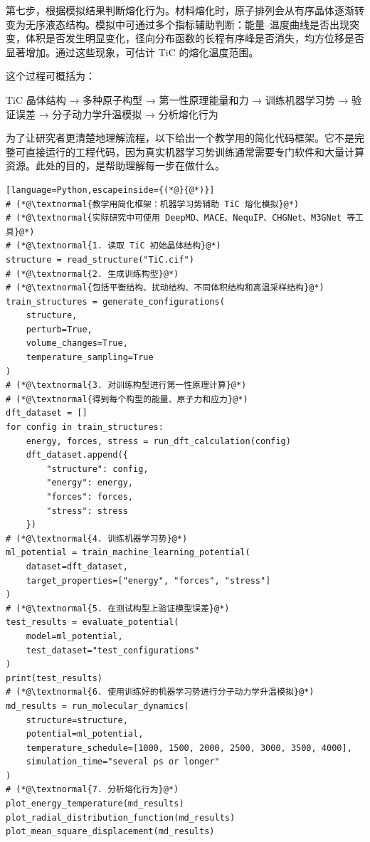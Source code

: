 第七步，根据模拟结果判断熔化行为。材料熔化时，原子排列会从有序晶体逐渐转变为无序液态结构。模拟中可通过多个指标辅助判断：能量--温度曲线是否出现突变，体积是否发生明显变化，径向分布函数的长程有序峰是否消失，均方位移是否显著增加。通过这些现象，可估计 TiC 的熔化温度范围。


这个过程可概括为：


\begin{lightquote}
\centering TiC 晶体结构 → 多种原子构型 → 第一性原理能量和力 → 训练机器学习势 → 验证误差 → 分子动力学升温模拟 → 分析熔化行为
\end{lightquote}

为了让研究者更清楚地理解流程，以下给出一个教学用的简化代码框架。它不是完整可直接运行的工程代码，因为真实机器学习势训练通常需要专门软件和大量计算资源。此处的目的，是帮助理解每一步在做什么。


\begin{lstlisting}[language=Python,escapeinside={(*@}{@*)}]
# (*@\textnormal{教学用简化框架：机器学习势辅助 TiC 熔化模拟}@*)
# (*@\textnormal{实际研究中可使用 DeepMD、MACE、NequIP、CHGNet、M3GNet 等工具}@*)
# (*@\textnormal{1. 读取 TiC 初始晶体结构}@*)
structure = read_structure("TiC.cif")
# (*@\textnormal{2. 生成训练构型}@*)
# (*@\textnormal{包括平衡结构、扰动结构、不同体积结构和高温采样结构}@*)
train_structures = generate_configurations(
    structure,
    perturb=True,
    volume_changes=True,
    temperature_sampling=True
)
# (*@\textnormal{3. 对训练构型进行第一性原理计算}@*)
# (*@\textnormal{得到每个构型的能量、原子力和应力}@*)
dft_dataset = []
for config in train_structures:
    energy, forces, stress = run_dft_calculation(config)
    dft_dataset.append({
        "structure": config,
        "energy": energy,
        "forces": forces,
        "stress": stress
    })
# (*@\textnormal{4. 训练机器学习势}@*)
ml_potential = train_machine_learning_potential(
    dataset=dft_dataset,
    target_properties=["energy", "forces", "stress"]
)
# (*@\textnormal{5. 在测试构型上验证模型误差}@*)
test_results = evaluate_potential(
    model=ml_potential,
    test_dataset="test_configurations"
)
print(test_results)
# (*@\textnormal{6. 使用训练好的机器学习势进行分子动力学升温模拟}@*)
md_results = run_molecular_dynamics(
    structure=structure,
    potential=ml_potential,
    temperature_schedule=[1000, 1500, 2000, 2500, 3000, 3500, 4000],
    simulation_time="several ps or longer"
)
# (*@\textnormal{7. 分析熔化行为}@*)
plot_energy_temperature(md_results)
plot_radial_distribution_function(md_results)
plot_mean_square_displacement(md_results)
\end{lstlisting}

